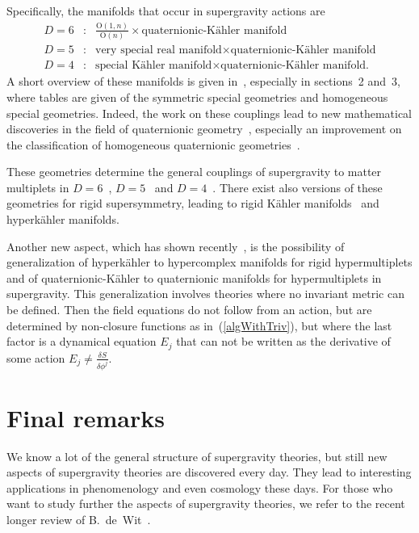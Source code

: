 \documentclass[a4paper,11pt,twoside]{article}
\newcommand{\Blue}[1]{#1}
\begin{document}
Specifically, the manifolds that occur in supergravity actions are
\begin{eqnarray}
  D=6& :& \frac{\mathrm{O}(1,n)}{\mathrm{O}(n)} \times \mbox{quaternionic-K{\"a}hler manifold} \nonumber\\
  D=5&:& \mbox{very special real manifold} \times \mbox{quaternionic-K{\"a}hler manifold} \nonumber\\
  D=4&:& \mbox{special K{\"a}hler manifold} \times \mbox{quaternionic-K{\"a}hler manifold.}
 \label{D654Special}
\end{eqnarray}
A short overview of these manifolds is given in~\cite{VanProeyen:2001wr},
especially in sections~2 and~3, where tables are given of the symmetric
special geometries and homogeneous special geometries. Indeed, the work
on these couplings lead to new mathematical discoveries in the field of
quaternionic geometry~\cite{deWit:1992nm,deWit:1995tf}, especially an
improvement on the classification of homogeneous quaternionic
geometries~\cite{Alekseevsky1975}.

These geometries determine the general couplings of supergravity to
matter multiplets in $D=6$~\cite{Bergshoeff:1986mz,Riccioni:2001bg},
$D=5$~\cite{Ceresole:2000jd} and
$D=4$~\cite{deWit:1985px,Andrianopoli:1997cm}. There exist also versions
of these geometries for rigid supersymmetry, leading to rigid K{\"a}hler
manifolds~\cite{Sierra:1983cc,Gates:1984py} and hyperk{\"a}hler manifolds.

Another new aspect, which has shown recently~\cite{Bergshoeff:2002qk}, is
the possibility of generalization of hyperk{\"a}hler to hypercomplex
manifolds for rigid hypermultiplets and of quaternionic-K{\"a}hler to
quaternionic manifolds for hypermultiplets in supergravity. This
generalization involves theories where no invariant metric can be
defined. Then the field equations do not follow from an action, but are
determined by non-closure functions as in~(\ref{algWithTriv}), but where
the last factor is a dynamical equation $E_j$ that can not be written as
the derivative of some action $E_j\neq \frac{\delta S}{\delta \Blue{\phi
^j}}$.

\section{Final remarks} \label{ss:final}

We know a lot of the general structure of supergravity theories, but
still new aspects of supergravity theories are discovered every day. They
lead to interesting applications in phenomenology and even cosmology
these days. For those who want to study further the aspects of
supergravity theories, we refer to the recent longer review of
B.~de~Wit~\cite{deWit:2002vz}.
\end{document}
